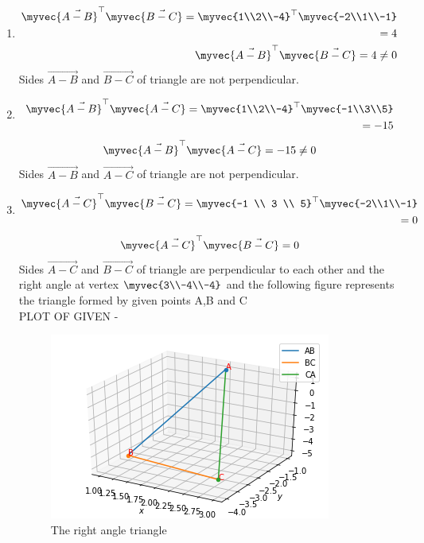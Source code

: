 \documentclass[journal,12pt,twocolumn]{IEEEtran}
\begin{document}
\begin{enumerate}
\item
\begin{align}
\myvec{\vec{A-B}}^\top \myvec{\vec{B-C}}=\myvec{1\\2\\-4}^\top\myvec{-2\\1\\-1}\\=4
\\
\myvec{\vec{A-B}}^\top\myvec{\vec{B-C}}=4\neq0
\end{align}
Sides $\vec{A-B}$ and $\vec{B-C}$ of triangle are not perpendicular.
\item
\begin{align}
\myvec{\vec{A-B}}^\top\myvec{\vec{A-C}}=\myvec{1\\2\\-4}^\top\myvec{-1\\3\\5}\\=-15
\end{align}
\begin{align}
\myvec{\vec{A-B}}^\top\myvec{\vec{A-C}}=-15\neq0
\end{align}
Sides $\vec{A-B}$ and $\vec{A-C}$ of triangle are not perpendicular.
\item
\begin{align}
\myvec{\vec{A-C}}^\top\myvec{\vec{B-C}}=\myvec{-1 \\ 3 \\ 5}^\top\myvec{-2\\1\\-1}\\=0
\end{align}
\begin{align}
\myvec{\vec{A-C}}^\top\myvec{\vec{B-C}}=0
\end{align}
Sides $\vec{A-C}$ and $\vec{B-C}$ of triangle are perpendicular to each other and the right angle at vertex $\myvec{3\\-4\\-4}$ and the following figure represents the triangle formed by given points A,B and C
\\
PLOT OF GIVEN -
\begin{figure}[ht]
\centering
\includegraphics[width=\columnwidth]{Right angle triangle.png}
\caption{The right angle triangle}
\label{fig: The right angle triangle.}
\end{figure}    
\end{enumerate}
\end{document}
